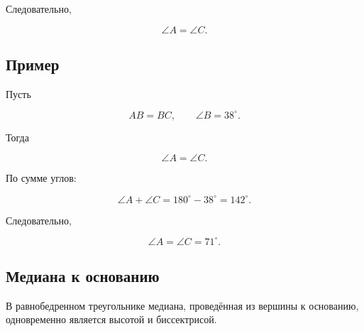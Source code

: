 \documentclass[a4paper,12pt]{article}
\begin{document}
Следовательно,

\[
\angle A=\angle C.
\]

\begin{minipage}[t]{0.52\linewidth}

\subsection*{Пример}

Пусть

\[
AB=BC,
\qquad
\angle B=38^\circ.
\]

Тогда

\[
\angle A=\angle C.
\]

По сумме углов:

\[
\angle A+\angle C
=
180^\circ-38^\circ
=
142^\circ.
\]

Следовательно,

\[
\angle A=\angle C=71^\circ.
\]

\end{minipage}
\hfill
\begin{minipage}[t]{0.42\linewidth}

\centering


\end{minipage}

\subsection*{Медиана к основанию}

В равнобедренном треугольнике медиана,
проведённая из вершины к основанию,
одновременно является высотой и биссектрисой.
\end{document}
